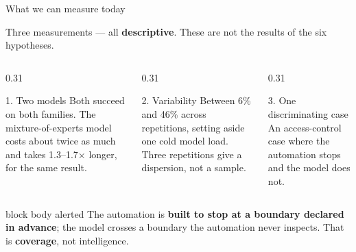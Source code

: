 \documentclass[aspectratio=169,10pt]{beamer}
\begin{document}
\begin{frame}{What we can measure today}

  \centering\small
  Three measurements --- all \textbf{descriptive}. These are not the results of
  the six hypotheses.

  \vspace{0.7em}
  \begin{columns}[T,onlytextwidth]
    \begin{column}{0.31\textwidth}
      \begin{block}{1. Two models}
        \scriptsize Both succeed on both families. The mixture-of-experts model
        costs about twice as much and takes 1.3--1.7$\times$ longer, for the
        same result.
      \end{block}
    \end{column}
    \begin{column}{0.31\textwidth}
      \begin{block}{2. Variability}
        \scriptsize Between 6\% and 46\% across repetitions, setting aside one
        cold model load. Three repetitions give a dispersion, not a sample.
      \end{block}
    \end{column}
    \begin{column}{0.31\textwidth}
      \begin{alertblock}{3. One discriminating case}
        \scriptsize An access-control case where the automation stops and the
        model does not.
      \end{alertblock}
    \end{column}
  \end{columns}

  \vspace{0.9em}
  \begin{beamercolorbox}[rounded=true,sep=1.2ex,wd=0.94\linewidth]{block body alerted}
    \small The automation is \textbf{built to stop at a boundary declared in
    advance}; the model crosses a boundary the automation never inspects.
    That is \textbf{coverage}, not intelligence.
  \end{beamercolorbox}

\end{frame}
\end{document}
